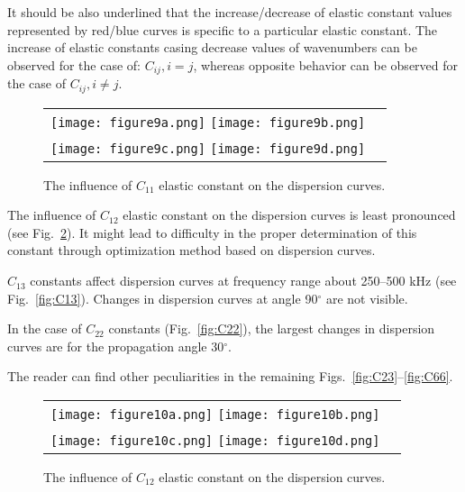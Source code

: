 \documentclass[]{spie}  %
\newcommand{\myfigscale}{0.9}
\begin{document}
It should be also underlined that the increase/decrease of elastic constant values represented by red/blue curves is specific to a particular elastic constant. 
The increase of elastic constants casing decrease values of wavenumbers can be observed for the case of: \(C_{ij}, i=j\), whereas opposite behavior can be observed for the case of  \(C_{ij}, i\ne j\).      
\begin{figure} [ht]
	\begin{center}
		\begin{tabular}{cc} %
			\texttt{[image: figure9a.png]}
			\texttt{[image: figure9b.png]}\\
			\texttt{[image: figure9c.png]}
			\texttt{[image: figure9d.png]}
		\end{tabular}
	\end{center}
	\caption[] 
	{ \label{fig:C11} 
		The influence of \(C_{11}\) elastic constant on the dispersion curves.}
\end{figure} 

The influence of \(C_{12}\) elastic constant on the dispersion curves is least pronounced (see Fig.~\ref{fig:C12}). 
It might lead to difficulty in the proper determination of this constant through optimization method based on dispersion curves.

\(C_{13}\) constants affect dispersion curves at frequency range about 250--500 kHz (see Fig.~\ref{fig:C13}).
Changes in dispersion curves at angle 90\(^{\circ}\) are not visible.

In the case of \(C_{22}\) constants (Fig.~\ref{fig:C22}), the largest changes in dispersion curves are for the propagation angle  30\(^{\circ}\). 

The reader can find other peculiarities in the remaining Figs.~\ref{fig:C23}--\ref{fig:C66}.
\begin{figure} [ht]
	\begin{center}
		\begin{tabular}{cc} %
			\texttt{[image: figure10a.png]}
			\texttt{[image: figure10b.png]}\\
			\texttt{[image: figure10c.png]}
			\texttt{[image: figure10d.png]}
		\end{tabular}
	\end{center}
	\caption[] 
	{ \label{fig:C12} 
		The influence of \(C_{12}\) elastic constant on the dispersion curves.}
\end{figure} 
\end{document}
